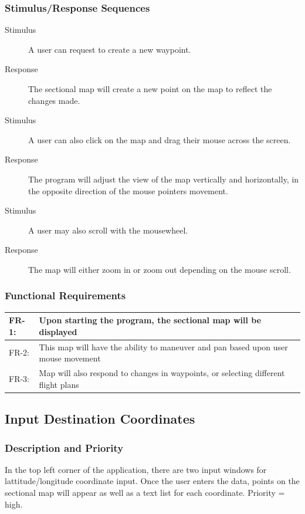 \documentclass[12pt, letterpaper]{article}
\begin{document}
    \subsubsection{Stimulus/Response Sequences}
      \begin{description}
        \item[Stimulus] A user can request to create a new waypoint.
		\item[Response]	The sectional map will create a new point on the map to
			reflect the changes made.
		\item[Stimulus] A user can also click on the map and drag their mouse 
			across the screen.
    \item[Response] The program will adjust the view of the map vertically and horizontally,
			in the opposite direction of the mouse pointers movement.
		\item[Stimulus] A user may also scroll with the mousewheel.
		\item[Response] The map will either zoom in or zoom out depending on the mouse scroll.
      \end{description}
    \subsubsection{Functional Requirements}
    \begin{tabularx}{\textwidth}{|l|X|} \hline
      FR-1: & Upon starting the program, the sectional map will be displayed\\ \hline
      FR-2: & This map will have the ability to maneuver and pan based upon user mouse movement\\ \hline
      FR-3: & Map will also respond to changes in waypoints, or selecting different flight plans\\ \hline
      \end{tabularx}

  \subsection{Input Destination Coordinates}
	
    \subsubsection{Description and Priority}
		In the top left corner of the application, there are two input windows for 
		lattitude/longitude coordinate input. Once the user enters the data, 
		points on the sectional map will appear as well as a text list for each 
		coordinate. Priority = high.
\end{document}
